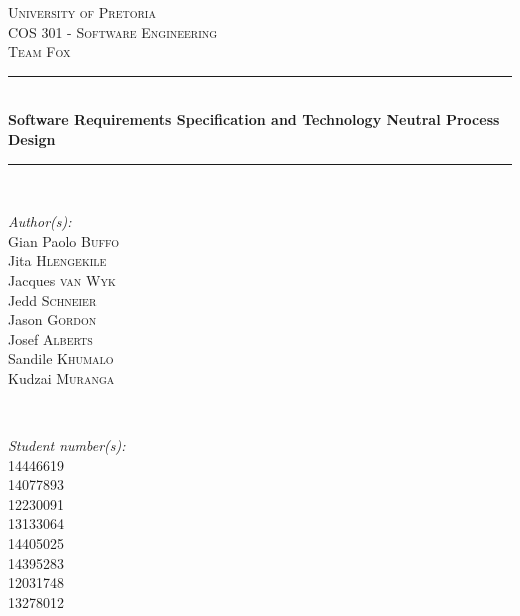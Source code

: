 \documentclass[a4paper,12pt]{article}
\begin{document}
\begin{titlepage}

\newcommand{\HRule}{\rule{\linewidth}{0.5mm}} %

\center %
 

\textsc{\LARGE University of Pretoria}\\[1.5cm]
\textsc{\Large COS 301 - Software Engineering}\\[0.5cm]
\textsc{\large Team Fox}\\[0.5cm]


\HRule \\[0.4cm]
{ \huge \bfseries Software Requirements Specification and Technology Neutral Process Design}\\[0.4cm] %
\HRule \\[1.5cm]
 

\begin{minipage}{0.4\textwidth}
\begin{flushleft} \large
\emph{Author(s):}\\
Gian Paolo \textsc{Buffo}\\ %
Jita \textsc{Hlengekile}\\
Jacques \textsc{van Wyk}\\
Jedd \textsc{Schneier}\\
Jason \textsc{Gordon}\\
Josef \textsc{Alberts}\\
Sandile \textsc{Khumalo}\\
Kudzai \textsc{Muranga}
\end{flushleft}
\end{minipage}
~
\begin{minipage}{0.4\textwidth}
\begin{flushright} \large
\emph{Student number(s):} \\
14446619\\ %
14077893\\
12230091\\
13133064\\
14405025\\
14395283 \\
12031748\\
13278012
\end{flushright}
\end{minipage}\\[4cm]



\end{titlepage}
\end{document}
